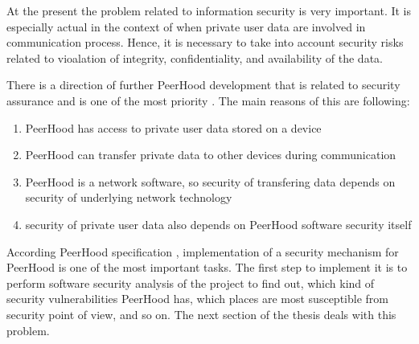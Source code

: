 %
At the present the problem related to information security is very important. 
%
It is especially actual in the context of  when private user data are involved in communication process. 
%
Hence, it is necessary to take into account security risks related to vioalation of integrity, confidentiality, and availability of the data. 


%
There is a direction of further PeerHood development that is related to security assurance and is one of the most priority . 
%
The main reasons of this are \The following: 
\begin{enumerate}
	\item PeerHood has access to private user data stored on a device
	\item PeerHood can transfer private data to other devices during communication
	\item PeerHood is a network software, so security of transfering data depends on security of underlying network technology
	\item security of private user data also depends on PeerHood software security itself
\end{enumerate}

%
According \The PeerHood specification , implementation of a security mechanism for PeerHood is one of the most important tasks. 
%
The first step to implement it is to perform software security analysis of the project to find out, which kind of security vulnerabilities PeerHood has, which places are most susceptible from security point of view, and so on. 
%
The next section of the thesis deals with this problem. 